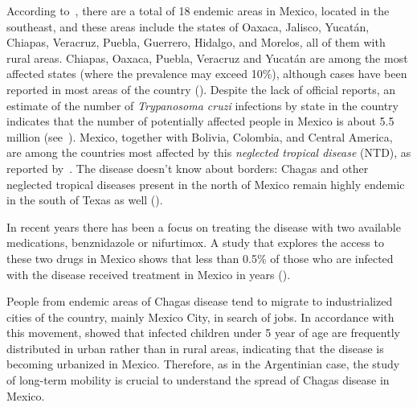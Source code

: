 According to~\cite{dumonteil1999update},
there are a total of 18 endemic areas in Mexico, located in the southeast, and
these areas include the states of Oaxaca, Jalisco, Yucatán, Chiapas, Veracruz,
Puebla, Guerrero, Hidalgo, and Morelos, all of them with rural areas.
Chiapas, Oaxaca, Puebla, Veracruz and Yucatán are among the most affected states (where the prevalence may exceed 10\%), although cases have been reported in most areas of the country (\cite{cruz2006chagmex,dumonteil1999update}).
Despite the lack of official reports, an estimate of the number of \textit{Trypanosoma cruzi} infections by state in the country
indicates that the number of potentially
affected people in Mexico is about 5.5 million (see~\cite{carabarin2013chagas}).
Mexico, together with Bolivia, Colombia, and Central
America, are among the countries most affected by this
\textit{neglected tropical disease} (NTD), as reported by~\cite{hotez2013innovation}.
The disease doesn't know about borders:
Chagas and other neglected tropical diseases present in the north of Mexico remain highly endemic in the south of Texas as well (\cite{hotez2012texas}).

In recent years there has been a focus on treating the disease with two available
medications, benznidazole or nifurtimox. A study
that explores the access to these two drugs in Mexico
shows that less than 0.5\% of those who are infected with
the disease received treatment in Mexico in years (\cite{manne2013barriers}).


People from endemic areas of Chagas disease tend to migrate to industrialized cities of the country, mainly Mexico City, in search of jobs.
In accordance with this movement, \cite{guzman2001epidemiology} showed
that infected children under 5 year of age are frequently distributed in urban
rather than in rural areas, indicating that the disease is becoming urbanized in
Mexico.
Therefore, as in the Argentinian case, the study of long-term mobility is crucial to understand the spread of Chagas disease in Mexico.






